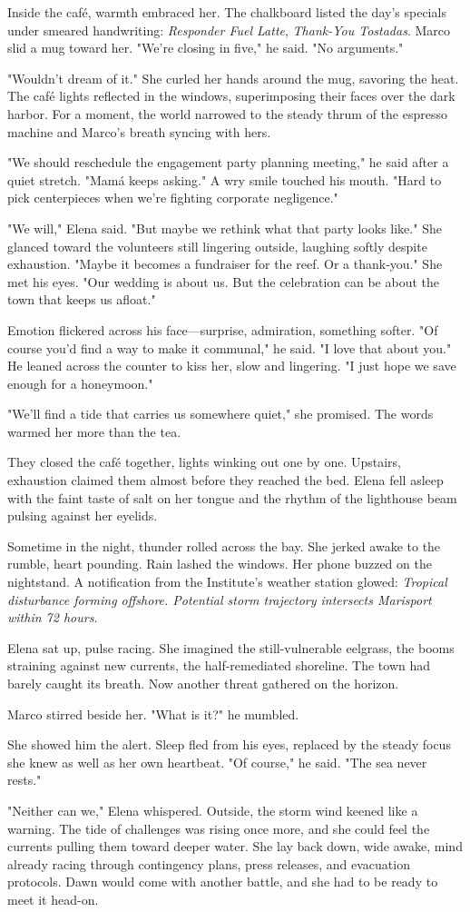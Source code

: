 Inside the café, warmth embraced her. The chalkboard listed the day's specials under smeared handwriting: \textit{Responder Fuel Latte}, \textit{Thank-You Tostadas}. Marco slid a mug toward her. "We're closing in five," he said. "No arguments."

"Wouldn't dream of it." She curled her hands around the mug, savoring the heat. The café lights reflected in the windows, superimposing their faces over the dark harbor. For a moment, the world narrowed to the steady thrum of the espresso machine and Marco's breath syncing with hers.

"We should reschedule the engagement party planning meeting," he said after a quiet stretch. "Mamá keeps asking." A wry smile touched his mouth. "Hard to pick centerpieces when we're fighting corporate negligence."

"We will," Elena said. "But maybe we rethink what that party looks like." She glanced toward the volunteers still lingering outside, laughing softly despite exhaustion. "Maybe it becomes a fundraiser for the reef. Or a thank-you." She met his eyes. "Our wedding is about us. But the celebration can be about the town that keeps us afloat."

Emotion flickered across his face—surprise, admiration, something softer. "Of course you'd find a way to make it communal," he said. "I love that about you." He leaned across the counter to kiss her, slow and lingering. "I just hope we save enough for a honeymoon."

"We'll find a tide that carries us somewhere quiet," she promised. The words warmed her more than the tea.

They closed the café together, lights winking out one by one. Upstairs, exhaustion claimed them almost before they reached the bed. Elena fell asleep with the faint taste of salt on her tongue and the rhythm of the lighthouse beam pulsing against her eyelids.

Sometime in the night, thunder rolled across the bay. She jerked awake to the rumble, heart pounding. Rain lashed the windows. Her phone buzzed on the nightstand. A notification from the Institute's weather station glowed: \textit{Tropical disturbance forming offshore. Potential storm trajectory intersects Marisport within 72 hours.}

Elena sat up, pulse racing. She imagined the still-vulnerable eelgrass, the booms straining against new currents, the half-remediated shoreline. The town had barely caught its breath. Now another threat gathered on the horizon.

Marco stirred beside her. "What is it?" he mumbled.

She showed him the alert. Sleep fled from his eyes, replaced by the steady focus she knew as well as her own heartbeat. "Of course," he said. "The sea never rests."

"Neither can we," Elena whispered. Outside, the storm wind keened like a warning. The tide of challenges was rising once more, and she could feel the currents pulling them toward deeper water. She lay back down, wide awake, mind already racing through contingency plans, press releases, and evacuation protocols. Dawn would come with another battle, and she had to be ready to meet it head-on.

